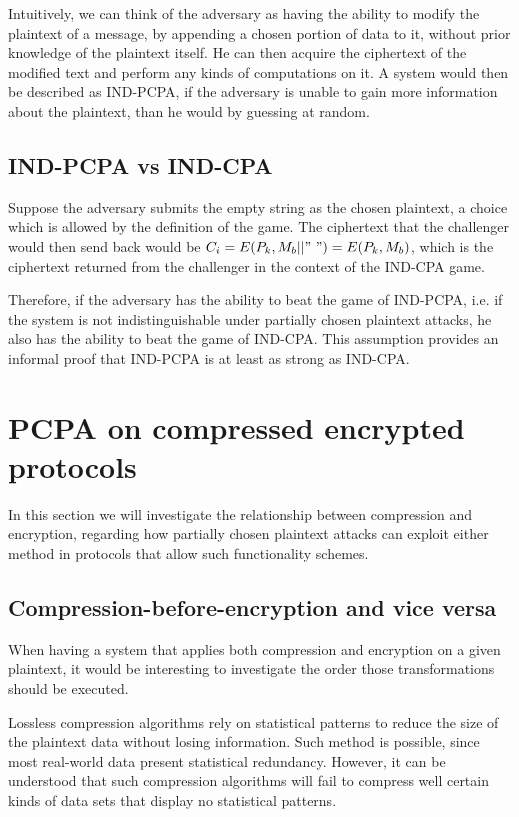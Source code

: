 Intuitively, we can think of the adversary as having the ability to modify the
plaintext of a message, by appending a chosen portion of data to it, without
prior knowledge of the plaintext itself. He can then acquire the ciphertext of
the modified text and perform any kinds of computations on it. A system would
then be described as IND-PCPA, if the adversary is unable to gain more
information about the plaintext, than he would by guessing at random.

\subsection{IND-PCPA vs IND-CPA}

Suppose the adversary submits the empty string as the chosen plaintext, a choice
which is allowed by the definition of the game. The ciphertext that the
challenger would then send back would be \begin{math}C_i = E(P_k, M_b||"\ ") =
E(P_k, M_b)\end{math}, which is the ciphertext returned from the challenger in
the context of the IND-CPA game.

Therefore, if the adversary has the ability to beat the game of IND-PCPA, i.e.
if the system is not indistinguishable under partially chosen plaintext attacks,
he also has the ability to beat the game of IND-CPA. This assumption
provides an informal proof that IND-PCPA is at least as strong as IND-CPA.

\section{PCPA on compressed encrypted protocols}\label{sec:cepcpa}

In this section we will investigate the relationship between compression and
encryption, regarding how partially chosen plaintext attacks can exploit either
method in protocols that allow such functionality schemes.

\subsection{Compression-before-encryption and vice versa}

When having a system that applies both compression and encryption on a given
plaintext, it would be interesting to investigate the order those
transformations should be executed.

Lossless compression algorithms rely on statistical patterns to reduce the size
of the plaintext data without losing information. Such method is possible,
since most real-world data present statistical redundancy. However, it
can be understood that such compression algorithms will fail to compress well
certain kinds of data sets that display no statistical patterns.

